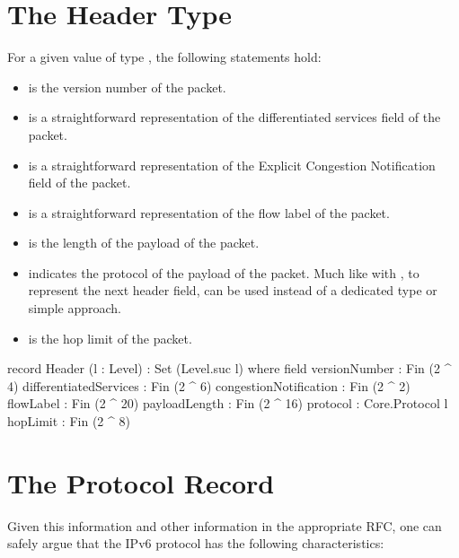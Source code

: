 \documentclass{report}
\begin{document}
\section{The Header Type}
For a given value  of type  , the following statements hold:

\begin{itemize}
  \item {}  is the version number of the  packet.
  \item {}  is a straightforward representation of the differentiated services field of the  packet.
  \item {}  is a straightforward representation of the Explicit Congestion Notification field of the  packet.
  \item {}  is a straightforward representation of the flow label of the  packet.
  \item {}  is the length of the payload of the  packet.
  \item {}  indicates the protocol of the payload of the  packet.  Much like with , to represent the next header field,  can be used instead of a dedicated type or simple  approach.
  \item {}  is the hop limit of the  packet.
\end{itemize}

\begin{code}
  record Header (l : Level) : Set (Level.suc l) where
    field
      versionNumber : Fin (2 ^ 4)
      differentiatedServices : Fin (2 ^ 6)
      congestionNotification : Fin (2 ^ 2)
      flowLabel : Fin (2 ^ 20)
      payloadLength : Fin (2 ^ 16)
      protocol : Core.Protocol l
      hopLimit : Fin (2 ^ 8)
\end{code}

\section{The Protocol Record}
Given this information and other information in the appropriate RFC, one can safely argue that the IPv6 protocol has the following characteristics:
\end{document}
